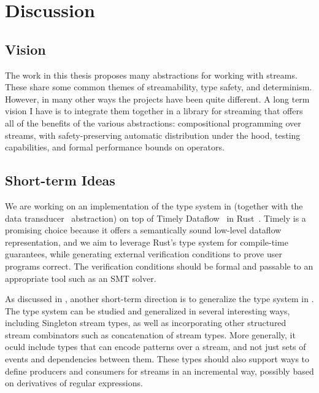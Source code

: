 \chapter{Discussion}
\label{cha:discussion}


\section{Vision}

The work in this thesis proposes many abstractions for working with streams. These share some common themes of streamability, type safety, and determinism.
However, in many other ways the projects have been quite different.
A long term vision I have is to integrate them together in a library for streaming that offers all of the benefits of the various abstractions:
compositional programming over streams, with safety-preserving automatic distribution under the hood, testing capabilities, and formal performance bounds on operators.

\section{Short-term Ideas}

We are working on an implementation of the type system in  (together with the data transducer~ abstraction) on top of Timely Dataflow~\cite{Timely,Naiad2013} in Rust~\cite{RustLang}.
Timely is a promising choice because it offers a semantically sound low-level dataflow representation,
and we aim to leverage Rust's type system for compile-time guarantees,
while generating external verification conditions to prove user programs correct.
The verification conditions should be formal and passable to an appropriate tool such as an SMT solver.

As discussed in , another short-term direction is to generalize the type system in .
The type system can be studied and generalized in several interesting ways, including Singleton stream types, as well as incorporating other structured stream combinators such as concatenation of stream types.
More generally, it oculd include types that can encode patterns over a stream, and not just sets of events and dependencies between them.
These types should also support ways to define producers and consumers for streams in an incremental way, possibly based on derivatives of regular expressions.

